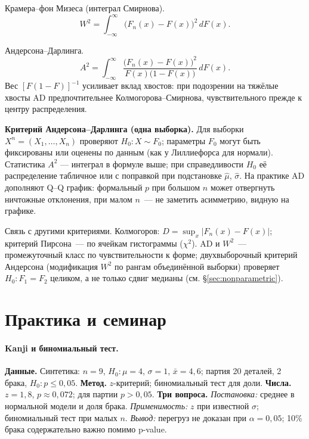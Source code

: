 Крамера--фон Мизеса (интеграл Смирнова).\[ W^2=\int_{-\infty}^{\infty}\bigl(F_n(x)-F(x)\bigr)^2\,dF(x).
 \]

Андерсона--Дарлинга.\[ A^2=\int_{-\infty}^{\infty} \frac{\bigl(F_n(x)-F(x)\bigr)^2}{F(x)\bigl(1-F(x)\bigr)}\,dF(x).
\] Вес $[F(1-F)]^{-1}$ усиливает вклад хвостов: при подозрении на тяжёлые хвосты AD предпочтительнее Колмогорова--Смирнова, чувствительного прежде к центру распределения.

\textbf{Критерий Андерсона--Дарлинга (одна выборка).}
Для выборки $X^n=(X_1,\ldots,X_n)$ проверяют $H_0\colon X\sim F_0$; параметры $F_0$ могут быть фиксированы или оценены по данным (как у Лиллиефорса для нормали).
Статистика $A^2$ --- интеграл в формуле выше; при справедливости $H_0$ её распределение табличное или с поправкой при подстановке $\hat\mu$, $\hat\sigma$.
На практике AD дополняют Q--Q график: формальный $p$ при большом $n$ может отвергнуть ничтожные отклонения, при малом $n$~--- не заметить асимметрию, видную на графике.

Связь с другими критериями. Колмогоров: $D=\sup_x|F_n(x)-F(x)|$; критерий Пирсона~--- по ячейкам гистограммы ($\chi^2$). AD и $W^2$~--- промежуточный класс по чувствительности к форме; двухвыборочный критерий Андерсона (модификация $W^2$ по рангам объединённой выборки) проверяет $H_0\colon F_1=F_2$ целиком, а не только сдвиг медианы (см. \S\ref{sec:nonparametric}).

\section{Практика и семинар}
\label{sec:practice-ch2}



\paragraph{Kanji и биномиальный тест.}
\textbf{Данные.} Синтетика: $n=9$, $H_0\colon\mu=4$, $\sigma=1$, $\bar x=4{,}6$; партия 20 деталей, 2 брака, $H_0\colon p\le 0{,}05$.
\textbf{Метод.} $z$-критерий; биномиальный тест для доли.
\textbf{Числа.} $z=1{,}8$, $p\approx 0{,}072$; для партии $p>0{,}05$.
\medskip\noindent\textbf{Три вопроса.} \textit{Постановка:} среднее в нормальной модели и доля брака.
\textit{Применимость:} $z$ при известной $\sigma$; биномиальный тест при малых $n$.
\textit{Вывод:} перегруз не доказан при $\alpha=0{,}05$; 10\% брака содержательно важно помимо p-value.\medskip

